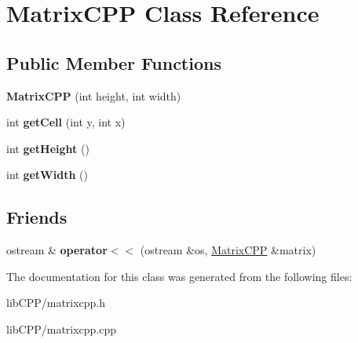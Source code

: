 \hypertarget{classMatrixCPP}{\section{Matrix\-C\-P\-P Class Reference}
\label{classMatrixCPP}
}
\subsection*{Public Member Functions}
\begin{DoxyCompactItemize}
\item 
\hypertarget{classMatrixCPP_a1cf5289e2db47d32331cd4ba9a47183e}{{\bfseries Matrix\-C\-P\-P} (int height, int width)}\label{classMatrixCPP_a1cf5289e2db47d32331cd4ba9a47183e}

\item 
\hypertarget{classMatrixCPP_a0b7ec5d9204172c038f4c33a2a181284}{int {\bfseries get\-Cell} (int y, int x)}\label{classMatrixCPP_a0b7ec5d9204172c038f4c33a2a181284}

\item 
\hypertarget{classMatrixCPP_a53cc93fd486bbf7b52d8956da6d7a544}{int {\bfseries get\-Height} ()}\label{classMatrixCPP_a53cc93fd486bbf7b52d8956da6d7a544}

\item 
\hypertarget{classMatrixCPP_a2687dd04c1799009e6b1a7f6597a55a7}{int {\bfseries get\-Width} ()}\label{classMatrixCPP_a2687dd04c1799009e6b1a7f6597a55a7}

\end{DoxyCompactItemize}
\subsection*{Friends}
\begin{DoxyCompactItemize}
\item 
\hypertarget{classMatrixCPP_a4b8aa19337adf1bab977dd08bc81e177}{ostream \& {\bfseries operator$<$$<$} (ostream \&os, \hyperlink{classMatrixCPP}{Matrix\-C\-P\-P} \&matrix)}\label{classMatrixCPP_a4b8aa19337adf1bab977dd08bc81e177}

\end{DoxyCompactItemize}


The documentation for this class was generated from the following files\-:\begin{DoxyCompactItemize}
\item 
lib\-C\-P\-P/matrixcpp.\-h\item 
lib\-C\-P\-P/matrixcpp.\-cpp\end{DoxyCompactItemize}
